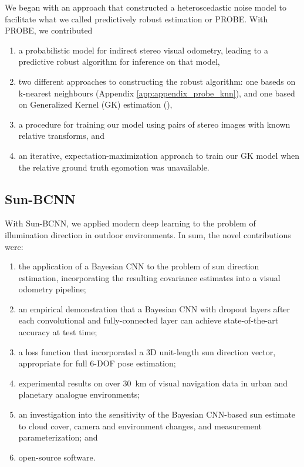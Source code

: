 We began with an approach that constructed a heteroscedastic noise model to facilitate what we called predictively robust estimation or PROBE. With PROBE, we contributed
\begin{enumerate}
\item a probabilistic model for indirect stereo visual odometry, leading to a predictive robust algorithm for inference on that model,
\item two different approaches to constructing the robust algorithm: one baseds on k-nearest neighbours (Appendix \ref{app:appendix_probe_knn}), and one based on Generalized Kernel (GK) estimation (),
\item a procedure for training our model using pairs of stereo images with known relative transforms, and
\item an iterative, expectation-maximization approach to train our GK model when the relative ground truth egomotion was unavailable.
\end{enumerate}



\subsection{Sun-BCNN}


With Sun-BCNN, we applied modern deep learning to the problem of illumination direction in outdoor environments. In sum, the novel contributions were:
\begin{enumerate}
\item the application of a Bayesian CNN to the problem of sun direction estimation, incorporating the resulting covariance estimates into a visual odometry pipeline; 
\item an empirical demonstration that a Bayesian CNN with dropout layers after each convolutional and fully-connected layer can achieve state-of-the-art accuracy at test time;
\item a loss function that incorporated a 3D unit-length sun direction vector, appropriate for full 6-DOF pose estimation;
\item experimental results on over 30~km of visual navigation data in urban \citep{Geiger2013-ky} and planetary analogue \citep{Furgale2012-kk} environments; 
\item an investigation into the sensitivity of the Bayesian CNN-based sun estimate to cloud cover, camera and environment changes, and measurement parameterization; and
\item open-source software.
\end{enumerate}

